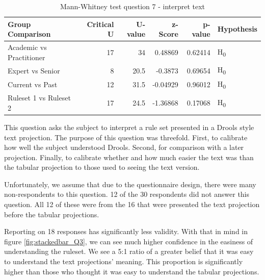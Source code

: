 \begin{table}[H]
    \begin{center}
        \begin{tabular}{ |l ||r |r |r | r|l | } 
            \hline
            Group Comparison                 & Critical U & U-value & z-Score  & p-value & Hypothesis         \\
            \hline
            \hline
            Academic vs Practitioner         & 17         & 34      &  0.48869 & 0.62414 & H\textsubscript{0} \\ 
            \hline
            Expert vs Senior                 & 8          & 20.5    &  -0.3873 & 0.69654 & H\textsubscript{0} \\ 
            \hline
            Current vs Past                  & 12         & 31.5    &  -0.04929& 0.96012 & H\textsubscript{0} \\ 
            \hline
            Ruleset 1 vs Ruleset 2           & 17         & 24.5    &  -1.36868& 0.17068 & H\textsubscript{0} \\ 
            \hline
        \end{tabular}
    \end{center}
    \caption{Mann-Whitney test question 7 - interpret text}
    \label{table:mannwhitneyQ3}
\end{table}

This question asks the subject to interpret a rule set presented in a Drools style text projection.
The purpose of this question was threefold.
First, to calibrate how well the subject understood Drools.
Second, for comparison with a later projection.
Finally, to calibrate whether and how much easier the text was than the tabular projection to those used to seeing the text version.

Unfortunately, we assume that due to the questionnaire design, there were many non-respondents to this question. 
12 of the 30 respondents did not answer this question.
All 12 of these were from the 16 that were presented the text projection before the tabular projections.

Reporting on 18 responses has significantly less validity.
With that in mind in figure \ref{fig:stackedbar_Q3}, we can see much higher confidence in the easiness of understanding the ruleset.
We see a 5:1 ratio of a greater belief that it was easy to understand the text projections' meaning.
This proportion is significantly higher than those who thought it was easy to understand the tabular projections.

